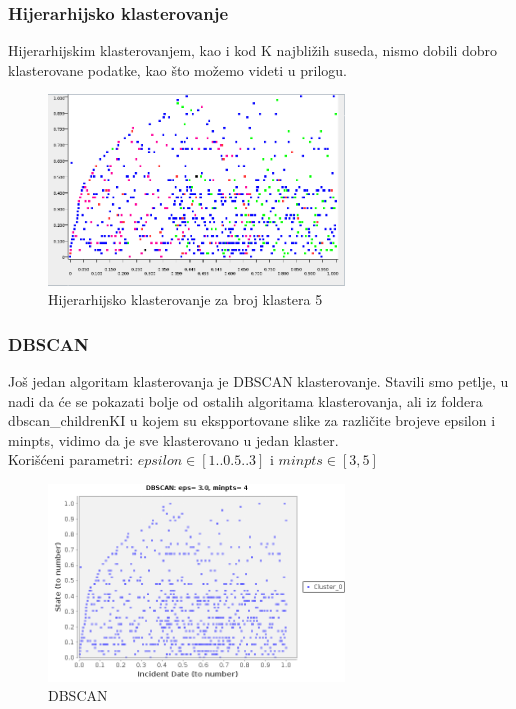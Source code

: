 \documentclass[12pt, a4paper]{article}
\begin{document}
\subsubsection{Hijerarhijsko klasterovanje}
Hijerarhijskim klasterovanjem, kao i kod K najbli\v zih suseda, nismo dobili dobro klasterovane podatke, kao \v sto mo\v zemo videti u prilogu.
\begin{figure}[H]
\centering
\includegraphics[width=0.7\textwidth]{hierarchicalClustering_childrenKI.png}
\caption{Hijerarhijsko klasterovanje za broj klastera 5}
\end{figure}


\subsubsection{DBSCAN}
Jo\v s jedan algoritam klasterovanja je DBSCAN klasterovanje. 
Stavili smo petlje, u nadi da \' ce se pokazati bolje od ostalih algoritama klasterovanja,
ali iz foldera dbscan\_childrenKI u kojem su ekspportovane slike za razli\v cite brojeve epsilon i minpts, vidimo da je sve klasterovano u jedan klaster.\\ 
Kori\v s\' ceni parametri: 
$epsilon \in [1..0.5..3]$ i $minpts \in [3,5]$
\begin{figure}[H]
\centering
\includegraphics[width=0.7\textwidth]{dbscan_eps_3_0_minpts_4.png}
\caption{DBSCAN}
\end{figure}
\end{document}
